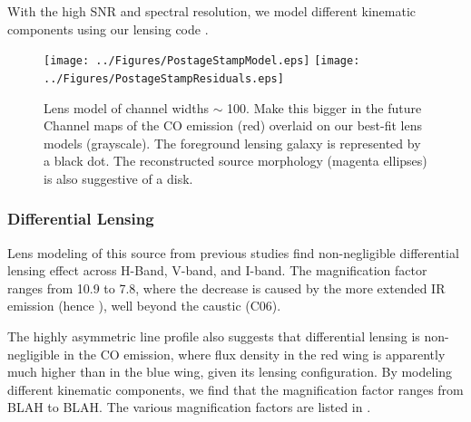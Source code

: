 \documentclass[]{emulateapj}
\begin{document}
With the high SNR and spectral resolution, we model different kinematic components using our lensing code \uvmcmcfit.





\begin{figure}[tbph]
\centering
\texttt{[image: ../Figures/PostageStampModel.eps]}
\texttt{[image: ../Figures/PostageStampResiduals.eps]}
\caption{
Lens model of channel widths $\sim$ 100\kms.
Make this bigger in the future
Channel maps of the CO emission (red) overlaid on our best-fit lens models (grayscale). The foreground lensing galaxy is represented by a black dot. The reconstructed source morphology (magenta ellipses) is also suggestive of a disk.
\label{fig:model}}
\end{figure}



\subsubsection{Differential Lensing} \label{sec:differential}
Lens modeling of this source from previous studies find non-negligible differential lensing effect across H-Band, V-band, and I-band. The magnification factor ranges from 10.9
to 7.8, where the decrease is caused
by the more extended IR emission (hence \SF), well beyond the caustic (C06).

The highly asymmetric \bco line profile also suggests that differential lensing is non-negligible in the CO emission, where
flux density in the red wing is apparently much higher than in the blue wing, given its lensing configuration.
By modeling different kinematic components, we find that the magnification factor ranges from BLAH to BLAH. The various magnification factors are listed in .

\end{document}
